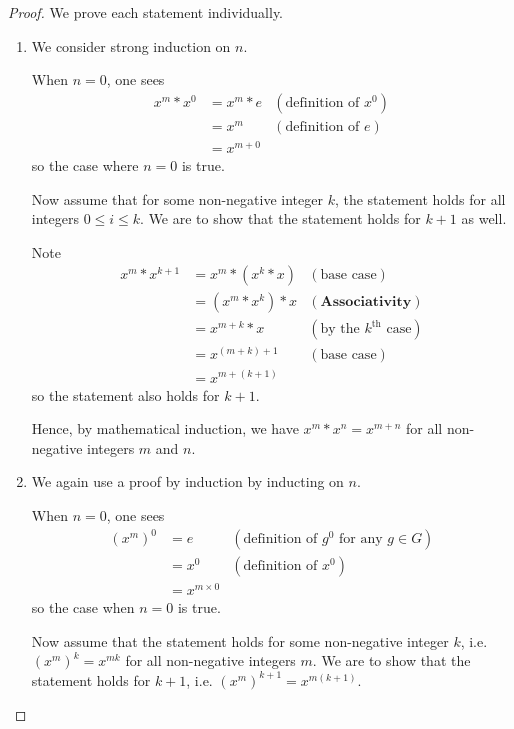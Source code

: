 \begin{proof}
    We prove each statement individually.
    \begin{enumerate}
        \item We consider strong induction on $n$.

        When $n = 0$, one sees
        \begin{align*}
            x^m \ast x^0 &= x^m \ast e & (\text{definition of }x^0)\\
            &= x^m & (\text{definition of }e)\\
            &= x^{m+0}
        \end{align*}
        so the case where $n=0$ is true.

        Now assume that for some non-negative integer $k$, the statement holds for all integers $0 \leq i \leq k$. We are to show that the statement holds for $k+1$ as well.

        Note
        \begin{align*}
            x^m\ast x^{k+1} &= x^m\ast (x^k\ast x) & (\text{base case})\\
            &= (x^m \ast x^k) \ast x & (\textbf{Associativity})\\
            &= x^{m+k}\ast x & (\text{by the }k^{\text{th}}\text{ case})\\
            &= x^{(m+k)+1} & (\text{base case})\\
            &= x^{m+(k+1)}
        \end{align*}
        so the statement also holds for $k+1$.

        Hence, by mathematical induction, we have $x^m \ast x^n = x^{m+n}$ for all non-negative integers $m$ and $n$.

        \item We again use a proof by induction by inducting on $n$.

        When $n = 0$, one sees
        \begin{align*}
            \left(x^m\right)^0 &= e & (\text{definition of }g^0 \text{ for any }g\in G)\\
            &= x^0 & (\text{definition of }x^0)\\
            &= x^{m \times 0}
        \end{align*}
        so the case when $n = 0$ is true.

        Now assume that the statement holds for some non-negative integer $k$, i.e. $\left(x^m\right)^k = x^{mk}$ for all non-negative integers $m$. We are to show that the statement holds for $k+1$, i.e. $\left(x^m\right)^{k+1} = x^{m(k+1)}$.


\end{enumerate}
\end{proof}
